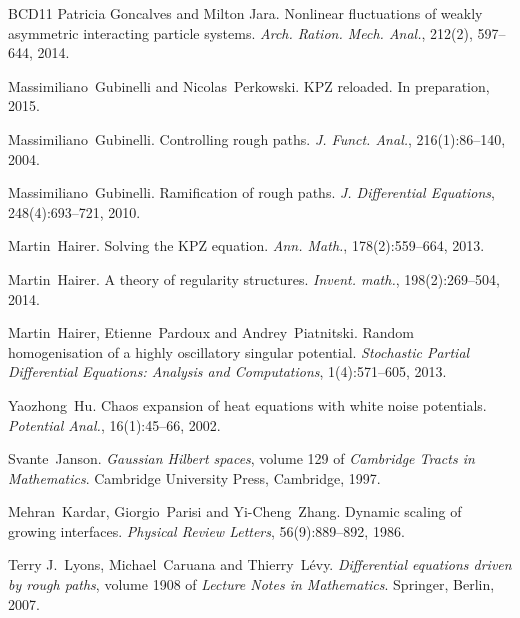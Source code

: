 \documentclass[a4paper,11pt]{article}
\newcommand{\tmtextit}[1]{{\itshape{#1}}}
\begin{document}
\begin{thebibliography}{BCD11}
  Patricia Goncalves and Milton Jara.{\newblock} Nonlinear fluctuations of weakly asymmetric interacting particle systems. {\newblock} \tmtextit{Arch. Ration. Mech. Anal.}, 212(2), 597--644, 2014.{\newblock}
  
  Massimiliano~Gubinelli  and 
  Nicolas~Perkowski.{\newblock} KPZ reloaded.{\newblock} In preparation, 2015.{\newblock}
  
  Massimiliano~Gubinelli.{\newblock} Controlling
  rough paths.{\newblock} \tmtextit{J. Funct. Anal.}, 216(1):86--140, 
  2004.{\newblock}
  
  Massimiliano~Gubinelli.{\newblock}
  Ramification of rough paths.{\newblock} \tmtextit{J. Differential
  Equations}, 248(4):693--721, 2010.{\newblock}
  
  Martin~Hairer.{\newblock} Solving the KPZ
  equation.{\newblock} \tmtextit{Ann. Math.}, 178(2):559--664,
  2013.{\newblock}
  
  Martin~Hairer.{\newblock} A theory of regularity
  structures.{\newblock} \tmtextit{Invent. math.}, 198(2):269--504, 2014.{\newblock}
  
  Martin~Hairer, Etienne~Pardoux  and 
  Andrey~Piatnitski.{\newblock} Random homogenisation of a highly oscillatory
  singular potential.{\newblock} \tmtextit{Stochastic Partial Differential
  Equations: Analysis and Computations}, 1(4):571--605, 2013.{\newblock}
  
  Yaozhong~Hu.{\newblock} Chaos expansion of heat
  equations with white noise potentials.{\newblock} \tmtextit{Potential
  Anal.}, 16(1):45--66, 2002.{\newblock}
  
  Svante~Janson.{\newblock} \tmtextit{Gaussian
  Hilbert spaces},  volume  129  of \tmtextit{Cambridge Tracts in
  Mathematics}.{\newblock} Cambridge University Press, Cambridge,
  1997.{\newblock}
  
  Mehran~Kardar, Giorgio~Parisi  and 
  Yi-Cheng~Zhang.{\newblock} Dynamic scaling of growing interfaces.{\newblock}
  \tmtextit{Physical Review Letters}, 56(9):889--892, 1986.{\newblock}
  
  Terry J.~Lyons, Michael~Caruana  and 
  Thierry~L{\'e}vy.{\newblock} \tmtextit{Differential equations driven
  by rough paths},  volume  1908  of \tmtextit{Lecture Notes in
  Mathematics}.{\newblock} Springer, Berlin, 2007.{\newblock}
  

\end{thebibliography}
\end{document}
